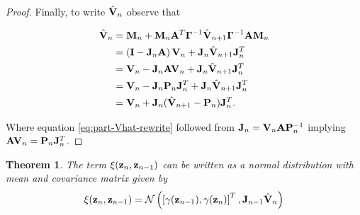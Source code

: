 \documentclass[11pt]{article}
\numberwithin{equation}{section}
\newcommand{\z}{{\bf z}}
\newcommand{\N}{\mathcal{N}}
\newtheorem{theorem}{Theorem}[section]
\begin{document}
\begin{proof}
	Finally, to write $\hat{{\bf V}}_n$ observe that 
	
	\begin{align}
		\hat{{\bf V}}_n
		&= {\bf M}_n + {\bf M}_n {\bf A}^T \boldsymbol{\Gamma}^{-1} \hat{\bf V}_{n+1}\boldsymbol\Gamma^{-1}{\bf A}{\bf M}_n\\
		&= \left({\bf I} - {\bf J}_n{\bf A}\right){\bf V}_n + {\bf J}_n\hat{\bf V}_{n+1}{\bf J}_n^T\\
		&= {\bf V}_n - {\bf J}_n{\bf A}{\bf V}_n + {\bf J}_n\hat{\bf V}_{n+1}{\bf J}_n^T\\
		&= {\bf V}_n - {\bf J}_n{\bf P}_n{\bf J}_n^T + {\bf J}_n\hat{\bf V}_{n+1}{\bf J}_n^T \label{eq:part-Vhat-rewrite} \\
		&= {\bf V}_n + {\bf J}_n(\hat{\bf V}_{n+1} - {\bf P}_n){\bf J}_n^T.\\
	\end{align}
	
	Where equation \eqref{eq:part-Vhat-rewrite} followed from ${\bf J}_n = {\bf V}_n{\bf A}{\bf P}_n^{-1}$ implying ${\bf AV}_n = {\bf P}_n{\bf J}_n^T$.
\end{proof}

\begin{theorem}
	The term $\xi(\z_n, \z_{n-1})$ can be written as a normal distribution with mean and covariance matrix given by
	\begin{equation}
		\xi(\z_n, \z_{n-1}) = \N\left(\left[\gamma(\z_{n-1}), \gamma(\z_{n})\right]^T, {\bf J}_{n-1}\hat{\bf V}_{n}\right)
	\end{equation}
\end{theorem}
\end{document}
